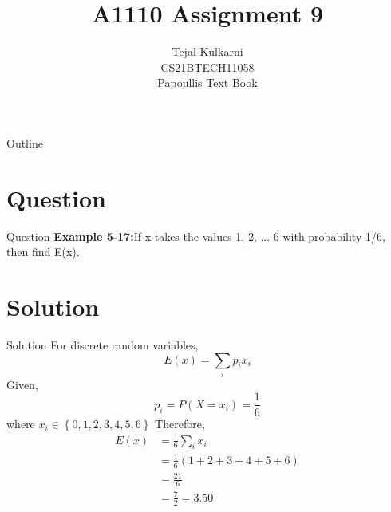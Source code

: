 \documentclass{beamer}
\title{A1110 Assignment 9 }
\author{Tejal Kulkarni \\ CS21BTECH11058 \\\vspace*{20pt} Papoullis Text Book }
\begin{document}
\providecommand{\pr}[1]{\ensuremath{\Pr\left(#1\right)}}
\providecommand{\cdf}[2]{\ensuremath{\text{F}_{#1}\left(#2\right)}}
\providecommand{\qfunc}[1]{\ensuremath{Q\left(#1\right)}}
\providecommand{\sbrak}[1]{\ensuremath{{}\left[#1\right]}}
\providecommand{\lsbrak}[1]{\ensuremath{{}\left[#1\right.}}
\providecommand{\rsbrak}[1]{\ensuremath{{}\left.#1\right]}}
\providecommand{\brak}[1]{\ensuremath{\left(#1\right)}}
\providecommand{\lbrak}[1]{\ensuremath{\left(#1\right.}}
\providecommand{\rbrak}[1]{\ensuremath{\left.#1\right)}}
\providecommand{\cbrak}[1]{\ensuremath{\left\{#1\right\}}}
\providecommand{\lcbrak}[1]{\ensuremath{\left\{#1\right.}}
\providecommand{\rcbrak}[1]{\ensuremath{\left.#1\right\}}}
\newcommand*{\permcomb}[4][0mu]{{{}^{#3}\mkern#1#2_{#4}}}
\newcommand*{\perm}[1][-3mu]{\permcomb[#1]{P}}
\newcommand*{\comb}[1][-1mu]{\permcomb[#1]{C}}
\renewcommand{\thetable}{\arabic{table}} 

\begin{frame}
    \titlepage
\end{frame}

\begin{frame}{Outline}
  \tableofcontents
\end{frame}

\section{Question}
\begin{frame}{Question}
   \textbf{Example 5-17:}If x takes the values 1, 2, ... 6 with probability 1/6, then find E(x). 
\end{frame}

\section{Solution}
\begin{frame}{Solution}
 For discrete random variables, 
\begin{equation}
    E(x) = \sum_{i} p_ix_i   
\end{equation}
Given,
\begin{equation}
    p_i = P(X = x_i) = \frac{1}{6}
\end{equation}
where $x_i\in \cbrak{0,1,2,3,4,5,6}$
Therefore,
\begin{align}
    E(x) &= \frac{1}{6}\sum_{i} x_i \\
         &= \frac{1}{6}\brak{1+2+3+4+5+6} \\
         &= \frac{21}{6} \\
         &= \frac{7}{2} = \boxed{3.50}
\end{align}
\end{frame}
\end{document}
